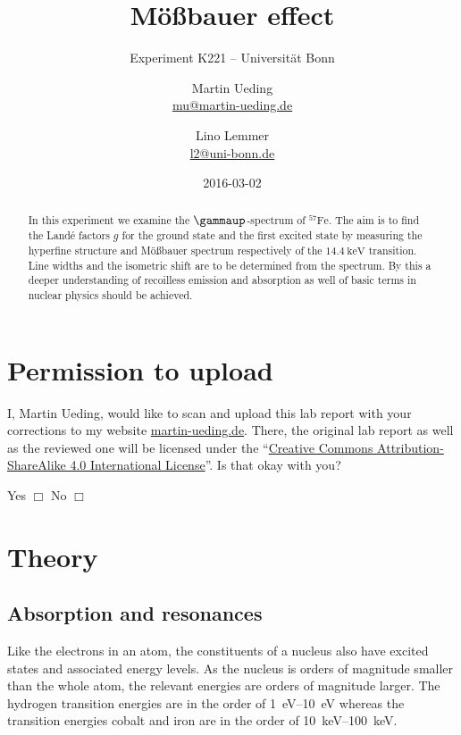 \documentclass[11pt, english, fleqn, DIV=15, headinclude, BCOR=2cm]{scrreprt}
\title{Mößbauer effect}
\subtitle{Experiment K221 -- Universität Bonn}
\author{%
    Martin Ueding \\
    \small{\href{mailto:mu@martin-ueding.de}{mu@martin-ueding.de}}
    \and
    Lino Lemmer \\
    \small{\href{mailto:l2@uni-bonn.de}{l2@uni-bonn.de}}
}
\date{2016-03-02}
\begin{document}
\maketitle

\begin{abstract}
    In this experiment we examine the $\gammaup$-spectrum of
    $^{57}\mathrm{Fe}$. The aim is to find the Landé factors $g$ for the ground
    state and the first excited state by measuring the hyperfine structure and
    Mößbauer spectrum respectively of the $\SI{14.4}{\kilo\electronvolt}$
    transition. Line widths and the isometric shift are to be determined from
    the spectrum. By this a deeper understanding of recoilless emission and
    absorption as well of basic terms in nuclear physics should be achieved.
\end{abstract}

\tableofcontents

\chapter*{Permission to upload}

I, Martin Ueding, would like to scan and upload this lab report with your
corrections to my website \href{http://martin-ueding.de}{martin-ueding.de}.
There, the original lab report as well as the reviewed one will be licensed
under the “\href{http://creativecommons.org/licenses/by-sa/4.0/}{Creative
Commons Attribution-ShareAlike 4.0 International License}”. Is that okay with
you?

Yes $\Box$ \hspace{2cm} No $\Box$

\chapter{Theory}

\section{Absorption and resonances}

Like the electrons in an atom, the constituents of a nucleus also have
excited states and associated energy levels. As the nucleus is orders of
magnitude smaller than the whole atom, the relevant energies are orders of
magnitude larger. The hydrogen transition energies are in the order of
\SIrange{1}{10}{\electronvolt} whereas the transition energies cobalt and iron
are in the order of \SIrange{10}{100}{\kilo\electronvolt}.
\end{document}
